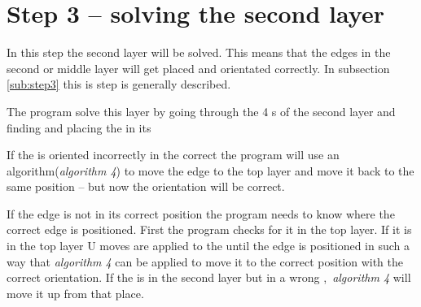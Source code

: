 \section{Step 3 -- solving the second layer}
In this step the second layer will be solved. 
This means that the edges in the second or middle layer will get placed and orientated correctly. 
In subsection \ref{sub:step3} this is step is generally described. 

The program solve this layer by going through the 4 \cubicle{}s of the second layer and finding and placing the \cpiece{} in its \cubicle{}

If the \cpiece is oriented incorrectly in the correct \cubicle{} the program will use an algorithm(\textit{algorithm 4})  to move the edge \cpiece{} to the top layer and move it back to the same position -- but now the orientation will be correct. 

If the edge \cpiece{} is not in its correct position the program needs to know where the correct edge \cpiece{} is positioned. First the program checks for it in the top layer. 
If it is in the top layer U moves are applied to the \rubik{} until the edge \cpiece{} is positioned in such a way that \textit{algorithm 4} can be applied to move it to the correct position with the correct orientation. 
If the \cpiece{} is in the second layer but in a wrong \cubicle{}, \textit{algorithm 4} will move it up from that place. 
